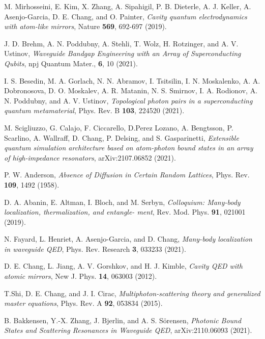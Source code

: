 \documentclass[pra,twocolumn,showpacs,preprintnumbers,amsmath,amssymb]{revtex4-1}
\begin{document}
\begin{thebibliography}{99}
 M. Mirhosseini, E. Kim, X. Zhang, A. Sipahigil, P. B. Dieterle, A. J. Keller, A. Asenjo-Garcia, D. E. Chang, and O. Painter, \textit{Cavity quantum electrodynamics with atom-like mirrors},   Nature  {\bf 569}, 692-697 (2019). 

 J. D. Brehm, A. N. Poddubny, A. Stehli, T. Wolz, H. Rotzinger,  and A. V. Ustinov,  \textit{Waveguide Bandgap Engineering with an Array of Superconducting Qubits}, npj Quantum Mater., {\bf 6}, 10 (2021).


 I. S. Besedin, M. A. Gorlach, N. N. Abramov, I. Tsitsilin, I. N. Moskalenko, A. A. Dobronosova, D. O. Moskalev, A. R. Matanin, N. S. Smirnov,
I. A. Rodionov, A. N. Poddubny, and A. V. Ustinov, \textit{Topological photon pairs in a superconducting quantum metamaterial},   Phys. Rev. B {\bf 103}, 224520 (2021).

 M. Scigliuzzo, G. Calajo, F. Ciccarello, D.Perez Lozano, A. Bengtsson, P. Scarlino, A. Wallraff, D. Chang, P. Delsing, and S. Gasparinetti, \textit{Extensible quantum simulation architecture based on atom-photon bound states in an array of high-impedance resonators},  arXiv:2107.06852 (2021).



 P. W. Anderson, \textit{Absence of Diffusion in Certain Random Lattices}, Phys. Rev.   {\bf 109}, 1492 (1958).  

 D. A. Abanin, E. Altman, I. Bloch, and M. Serbyn, \textit{Colloquium: Many-body localization, thermalization, and entangle-
ment},  Rev.  Mod. Phys.  {\bf 91}, 021001 (2019).  

 N. Fayard, L. Henriet, A. Asenjo-Garcia, and D. Chang, \textit{Many-body localization in waveguide QED},  Phys. Rev. Research {\bf 3}, 033233 (2021).  




 D. E. Chang, L. Jiang, A. V. Gorshkov, and H. J. Kimble,  \textit{Cavity QED with atomic mirrors}, New J. Phys. {\bf 14}, 063003 (2012). 

 T.Shi, D. E. Chang, and J. I. Cirac, \textit{Multiphoton-scattering theory and generalized master equations},  Phys. Rev. A {\bf 92}, 053834 (2015).

 B. Bakkensen, Y.-X. Zhang, J. Bjerlin, and A. S. S\"orensen, \textit{Photonic Bound States and Scattering Resonances in Waveguide QED},  arXiv:2110.06093 (2021).






\end{thebibliography}
\end{document}
